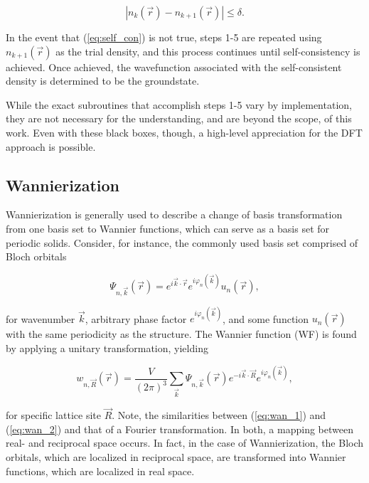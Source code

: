         \begin{equation}
        \label{eq:self_con}
            |n_{k}(\vec{r}) - n_{k+1}(\vec{r})| \le \delta.
        \end{equation}
        
        \noindent In the event that (\ref{eq:self_con}) is not true, steps 1-5 are repeated using $n_{k+1}(\Vec{r})$ as the trial density, and this process continues until self-consistency is achieved. Once achieved, the wavefunction associated with the self-consistent density is determined to be the groundstate.
        
        While the exact subroutines that accomplish steps 1-5 vary by implementation, they are not necessary for the understanding, and are beyond the scope, of this work. Even with these black boxes, though, a high-level appreciation for the DFT approach is possible.
    
    \subsection{Wannierization}
    
    Wannierization is generally used to describe a change of basis transformation from one basis set to Wannier functions, which can serve as a basis set for periodic solids. Consider, for instance, the commonly used basis set comprised of Bloch orbitals
    
    \begin{equation}
    \label{eq:wan_1}
        \Psi_{n,\vec{k}}(\Vec{r}) = e^{i\Vec{k}\cdot\Vec{r}} e^{i\varphi_n(\vec{k})} u_n(\vec{r}), 
    \end{equation}
    
    \noindent for wavenumber $\vec{k}$, arbitrary phase factor $e^{i\varphi_n(\vec{k})}$, and some function $u_n(\vec{r})$ with the same periodicity as the structure. The Wannier function (WF) is found by applying a unitary transformation, yielding
    
    \begin{equation}
    \label{eq:wan_2}
        w_{n,\vec{R}}(\Vec{r}) = \frac{V}{(2\pi)^3} \sum\limits_{\Vec{k}}  \Psi_{n,\vec{k}}(\Vec{r}) e^{-i\Vec{k}\cdot\Vec{R}} e^{i\varphi_n(\vec{k})},
    \end{equation}
    
    \noindent for specific lattice site $\vec{R}$. Note, the similarities between (\ref{eq:wan_1}) and (\ref{eq:wan_2}) and that of a Fourier transformation. In both, a mapping between real- and reciprocal space occurs. In fact, in the case of Wannierization, the Bloch orbitals, which are localized in reciprocal space, are transformed into Wannier functions, which are localized in real space.
    
